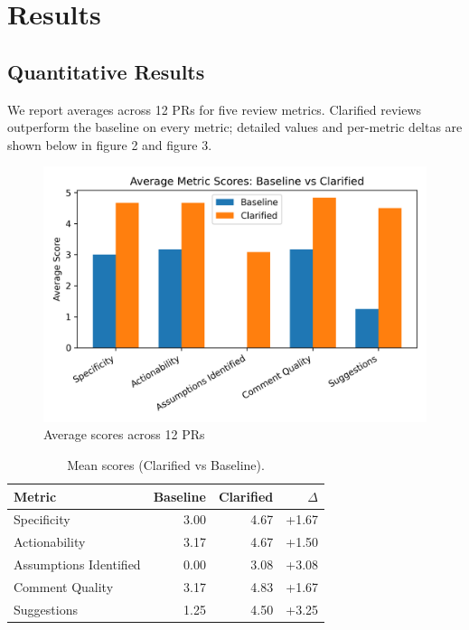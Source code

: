 \documentclass[conference]{IEEEtran}
\begin{document}
\section{Results}
\subsection{Quantitative Results}
We report averages across 12 PRs for five review metrics. Clarified
reviews outperform the baseline on every metric; detailed values and
per-metric deltas are shown below in figure 2 and figure 3.
\begin{figure}[t]
  \centering
  \includegraphics[width=\linewidth]{../results/plots/fig_metrics_bars.png}
  \caption{Average scores across 12 PRs}
  \label{fig:metrics}
\end{figure}

\begin{table}[h]
\centering
\caption{Mean scores (Clarified vs Baseline).}
\begin{tabular}{lrrr}
\toprule
Metric & Baseline & Clarified & $\Delta$ \\
\midrule
Specificity & 3.00 & 4.67 & +1.67 \\
Actionability & 3.17 & 4.67 & +1.50 \\
Assumptions Identified & 0.00 & 3.08 & +3.08 \\
Comment Quality & 3.17 & 4.83 & +1.67 \\
Suggestions & 1.25 & 4.50 & +3.25 \\
\bottomrule
\end{tabular}
\end{table}
\end{document}
